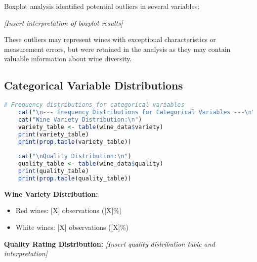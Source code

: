 Boxplot analysis identified potential outliers in several variables:

\textit{[Insert interpretation of boxplot results]}

These outliers may represent wines with exceptional characteristics or measurement errors, but were retained in the analysis as they may contain valuable information about wine diversity.

\subsection{Categorical Variable Distributions}

\begin{lstlisting}[language=R, caption=Frequency Distributions for Categorical Variables]
	# Frequency distributions for categorical variables
	cat("\n--- Frequency Distributions for Categorical Variables ---\n")
	cat("Wine Variety Distribution:\n")
	variety_table <- table(wine_data$variety)
	print(variety_table)
	print(prop.table(variety_table))
	
	cat("\nQuality Distribution:\n")
	quality_table <- table(wine_data$quality)
	print(quality_table)
	print(prop.table(quality_table))
\end{lstlisting}

\textbf{Wine Variety Distribution:}
\begin{itemize}
	\item Red wines: [X] observations ([X]\%)
	\item White wines: [X] observations ([X]\%)
\end{itemize}

\textbf{Quality Rating Distribution:}
\textit{[Insert quality distribution table and interpretation]}